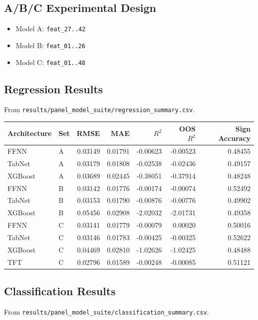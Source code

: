 \documentclass[11pt]{article}
\begin{document}
\subsection{A/B/C Experimental Design}
\begin{itemize}[leftmargin=1.2em]
  \item Model A: \texttt{feat\_27..42}
  \item Model B: \texttt{feat\_01..26}
  \item Model C: \texttt{feat\_01..48}
\end{itemize}

\subsection{Regression Results}
From \texttt{results/panel\_model\_suite/regression\_summary.csv}.

\begin{footnotesize}
\begin{longtable}{l l r r r r r}
\toprule
Architecture & Set & RMSE & MAE & $R^2$ & OOS $R^2$ & Sign Accuracy \\
\midrule
\endhead
FFNN & A & 0.03149 & 0.01791 & -0.00623 & -0.00523 & 0.48455 \\
TabNet & A & 0.03179 & 0.01808 & -0.02538 & -0.02436 & 0.49157 \\
XGBoost & A & 0.03689 & 0.02445 & -0.38051 & -0.37914 & 0.48248 \\
FFNN & B & 0.03142 & 0.01776 & -0.00174 & -0.00074 & 0.52492 \\
TabNet & B & 0.03153 & 0.01790 & -0.00876 & -0.00776 & 0.49902 \\
XGBoost & B & 0.05456 & 0.02908 & -2.02032 & -2.01731 & 0.49358 \\
FFNN & C & 0.03141 & 0.01779 & -0.00079 & 0.00020 & 0.50016 \\
TabNet & C & 0.03146 & 0.01783 & -0.00425 & -0.00325 & 0.52622 \\
XGBoost & C & 0.04469 & 0.02810 & -1.02626 & -1.02425 & 0.48488 \\
TFT & C & 0.02796 & 0.01589 & -0.00248 & -0.00085 & 0.51121 \\
\bottomrule
\end{longtable}
\end{footnotesize}

\subsection{Classification Results}
From \texttt{results/panel\_model\_suite/classification\_summary.csv}.
\end{document}
